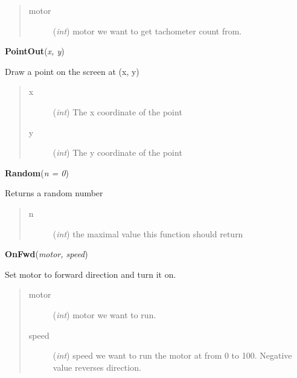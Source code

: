 \documentclass[10pt,a4paper]{article}
\begin{document}
\begin{quote}
    \begin{description}
        
\item[motor] ({\emph{int}}) motor we want to get tachometer count from.

    \end{description}
\end{quote}

 

\vspace{6pt}
{\bf PointOut}({\it x, y}) 
    
    Draw a point on the screen at (x, y)



    


\begin{quote}
    \begin{description}
        
\item[x] ({\emph{int}}) The x coordinate of the point

\item[y] ({\emph{int}}) The y coordinate of the point

    \end{description}
\end{quote}

 

\vspace{6pt}
{\bf Random}({\it n = 0}) 
    
    Returns a random number


    

\begin{quote}
    \begin{description}
        
\item[n] ({\emph{int}}) the maximal value this function should return

    \end{description}
\end{quote}

 

\vspace{6pt}
{\bf OnFwd}({\it motor, speed}) 
  
    Set motor to forward direction and turn it on.
    


    

\begin{quote}
    \begin{description}
        
\item[motor] ({\emph{int}}) motor we want to run.

\item[speed] ({\emph{int}}) speed we want to run the motor at from 0 to 100. Negative value reverses direction.   

    \end{description}
\end{quote}
\end{document}
